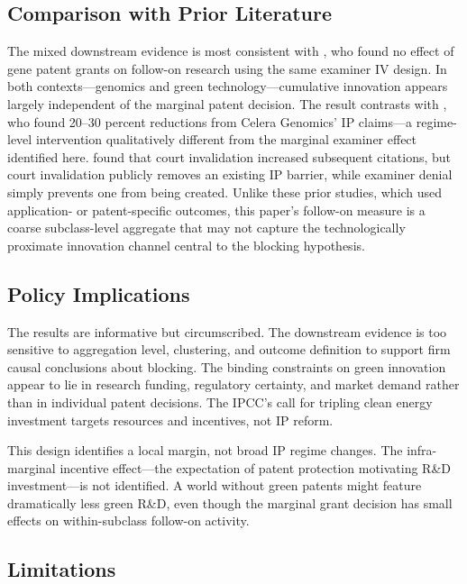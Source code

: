 \documentclass[12pt]{article}
\begin{document}
\subsection{Comparison with Prior Literature}

The mixed downstream evidence is most consistent with \citet{sampat2019}, who found no effect of gene patent grants on follow-on research using the same examiner IV design. In both contexts---genomics and green technology---cumulative innovation appears largely independent of the marginal patent decision. The result contrasts with \citet{williams2013}, who found 20--30 percent reductions from Celera Genomics' IP claims---a regime-level intervention qualitatively different from the marginal examiner effect identified here. \citet{galasso2015} found that court invalidation increased subsequent citations, but court invalidation publicly removes an existing IP barrier, while examiner denial simply prevents one from being created. Unlike these prior studies, which used application- or patent-specific outcomes, this paper's follow-on measure is a coarse subclass-level aggregate that may not capture the technologically proximate innovation channel central to the blocking hypothesis.

\subsection{Policy Implications}

The results are informative but circumscribed. The downstream evidence is too sensitive to aggregation level, clustering, and outcome definition to support firm causal conclusions about blocking. The binding constraints on green innovation appear to lie in research funding, regulatory certainty, and market demand rather than in individual patent decisions. The IPCC's call for tripling clean energy investment \citep{ipcc2023} targets resources and incentives, not IP reform.

This design identifies a local margin, not broad IP regime changes. The infra-marginal incentive effect---the expectation of patent protection motivating R\&D investment---is not identified. A world without green patents might feature dramatically less green R\&D, even though the marginal grant decision has small effects on within-subclass follow-on activity.

\subsection{Limitations}
\end{document}
